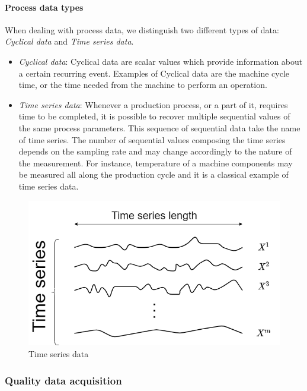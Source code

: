 \paragraph{Process data types}

When dealing with process data, we distinguish two different types of data: \textit{Cyclical data} and \textit{Time series data}.

\begin{itemize}
    \item \textit{Cyclical data}: Cyclical data are scalar values which provide information about a certain recurring event. Examples of Cyclical data are the machine cycle time, or the time needed from the machine to perform an operation. 
    \item \textit{Time series data}: Whenever a production process, or a part of it, requires time to be completed, it is possible to recover multiple sequential values of the same process parameters. This sequence of sequential data take the name of time series. The number of sequential values composing the time series depends on the sampling rate and may change accordingly to the nature of the measurement. For instance, temperature of a machine components may be measured all along the production cycle and it is a classical example of time series data.
\end{itemize}

\begin{figure}
\centering
\includegraphics[scale=0.5]{images/chapter_3/time_series_data.png}
\caption{Time series data}
\label{fig:time_series_data}
\end{figure}


\subsubsection{Quality data acquisition}

